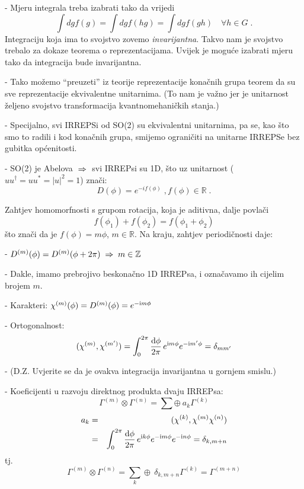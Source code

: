 - Mjeru integrala treba izabrati tako da vrijedi
\begin{displaymath}
  \int dg f(g) = \int dg f(hg) = \int dg f(gh) \quad \forall h \in G \;.
\end{displaymath}
Integraciju koja ima to svojstvo zovemo \emph{invarijantna}.  
Takvo nam je svojstvo
trebalo za dokaze teorema o reprezentacijama. Uvijek je moguće izabrati
mjeru tako da integracija bude invarijantna.

- Tako možemo ``preuzeti'' iz teorije reprezentacije konačnih grupa
  teorem da su sve reprezentacije ekvivalentne unitarnima. (To nam
 je važno jer je unitarnost željeno svojstvo transformacija kvantnomehaničkih
 stanja.)

- Specijalno, svi IRREPSi od SO(2) su ekvivalentni unitarnima, pa se,
  kao što smo to radili i kod konačnih grupa, smijemo ograničiti na
  unitarne IRREPSe bez gubitka općenitosti. 

- SO(2) je Abelova $\;\Rightarrow\;$ svi IRREPsi su 1D, što uz unitarnost 
($uu^\dagger = uu^* = |u|^2=1$) znači:
\begin{displaymath}
D(\phi)=e ^{-i f(\phi)} \;,  f(\phi) \in \mathbb{R} \;.
\end{displaymath}

Zahtjev homomorfnosti s grupom rotacija, koja je aditivna, dalje
povlači
\begin{displaymath}
   f(\phi_1)+f(\phi_2) = f(\phi_1+\phi_2)
\end{displaymath}
što znači da je $f(\phi)=m\phi$, $m\in\mathbb{R}$.
Na kraju, zahtjev periodičnosti daje:

- $D^{(m)}(\phi)=D^{(m)}(\phi + 2\pi) \;\Rightarrow\; m \in \mathbb{Z}$

- Dakle, imamo prebrojivo beskonačno 1D IRREPsa, i označavamo
  ih cijelim brojem $m$.

- Karakteri: $\chi^{(m)}(\phi)=D^{(m)}(\phi)=e^{-\textrm{\scriptsize i} m \phi}$

- Ortogonalnost:
\begin{displaymath}
(\chi^{(m)}, \chi^{(m')})=\int_{0}^{2\pi}\frac{\textrm{d} \phi}{2\pi}\,
 e^{\textrm{\scriptsize i} m \phi}e^{-\textrm{\scriptsize i} m' \phi} = \delta_{mm'}
\end{displaymath}

- (D.Z. Uvjerite se da je ovakva integracija invarijantna u gornjem smislu.)


- Koeficijenti u razvoju direktnog produkta dvaju IRREPsa:
\begin{displaymath}
  \Gamma^{(m)}\otimes\Gamma^{(n)} =
  \sum \oplus\: a_{k}\Gamma^{(k)} 
\end{displaymath}
\begin{eqnarray*}
a_{k} & = & (\chi^{(k)}, \chi^{(m)}\chi^{(n)}) \\
      & = & \int_{0}^{2\pi}\frac{\textrm{d} \phi}{2\pi}\,
    e^{\textrm{\scriptsize i} k \phi}e^{-\textrm{\scriptsize i} m \phi}e^{-\textrm{\scriptsize i} n \phi} = \delta_{k,m+n}
\end{eqnarray*}
tj.
\begin{displaymath}
  \Gamma^{(m)}\otimes\Gamma^{(n)} =
  \sum_{k} \oplus\: \delta_{k,m+n}\Gamma^{(k)} = \Gamma^{(m+n)}
\end{displaymath}

